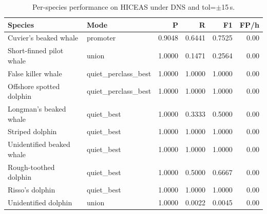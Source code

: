 \begin{table}[t]
\centering
\small
\begin{tabular}{l l r r r r}
\toprule
Species & Mode & P & R & F1 & FP/h \\
\midrule
Cuvier's beaked whale & promoter & 0.9048 & 0.6441 & 0.7525 & 0.00 \\
Short-finned pilot whale & union & 1.0000 & 0.1471 & 0.2564 & 0.00 \\
False killer whale & quiet_perclass_best & 1.0000 & 1.0000 & 1.0000 & 0.00 \\
Offshore spotted dolphin & quiet_perclass_best & 1.0000 & 1.0000 & 1.0000 & 0.00 \\
Longman's beaked whale & quiet_best & 1.0000 & 0.3333 & 0.5000 & 0.00 \\
Striped dolphin & quiet_best & 1.0000 & 1.0000 & 1.0000 & 0.00 \\
Unidentified beaked whale & quiet_best & 1.0000 & 1.0000 & 1.0000 & 0.00 \\
Rough-toothed dolphin & quiet_best & 1.0000 & 0.5000 & 0.6667 & 0.00 \\
Risso's dolphin & quiet_best & 1.0000 & 1.0000 & 1.0000 & 0.00 \\
Unidentified dolphin & union & 1.0000 & 0.0022 & 0.0045 & 0.00 \\
\bottomrule
\end{tabular}
\caption{Per-species performance on HICEAS under DNS and tol=$\pm$15\,s.}
\label{tab:hiceas15}
\end{table}